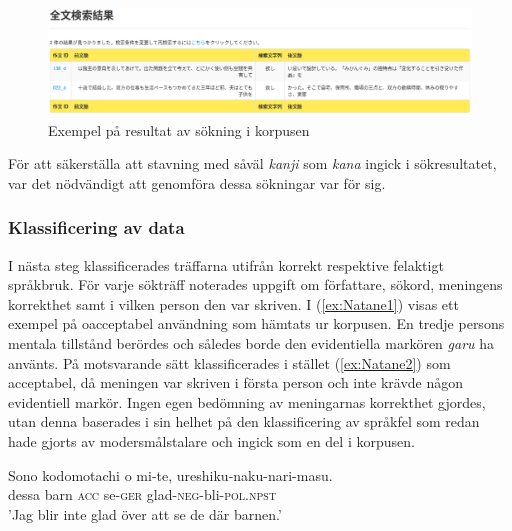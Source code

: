 \documentclass[12pt,a4paper]{article}
\begin{document}
\begin{figure}[h]
\caption{Exempel på resultat av sökning i korpusen}
\label{fig:Exempel på resultat av sökning}
\includegraphics[width=\textwidth]{images/Exempel på resultat av sökning}
\end{figure}

\noindent
För att säkerställa att stavning med såväl \emph{kanji} som \emph{kana} ingick i sökresultatet, var det nödvändigt att genomföra dessa sökningar var för sig.

\subsubsection{Klassificering av data}
\label{subsec:Undersökningen: Tillvägagångssätt: Klassificering av data}
I nästa steg klassificerades träffarna utifrån korrekt respektive felaktigt språkbruk. För varje sökträff noterades uppgift om författare, sökord, meningens korrekthet samt i vilken person den var skriven. I (\ref{ex:Natane1}) visas ett exempel på oacceptabel användning som hämtats ur korpusen. En tredje persons mentala tillstånd berördes och således borde den evidentiella markören \emph{garu} ha använts. På motsvarande sätt klassificerades i stället (\ref{ex:Natane2}) som acceptabel, då meningen var skriven i första person och inte krävde någon evidentiell markör. Ingen egen bedömning av meningarnas korrekthet gjordes, utan  denna baserades i sin helhet på den klassificering av språkfel som redan hade gjorts av modersmålstalare och ingick som en del i korpusen.

\begin{exe}
\end{exe}

\begin{exe}
\ex
\label{ex:Natane2}
\gll Sono kodomotachi o mi-te, ureshiku-naku-nari-masu. \\
     dessa barn \textsc{acc} se-\textsc{ger} glad-\textsc{neg}-bli-\textsc{pol}.\textsc{npst} \\
\glt 'Jag blir inte glad över att se de där barnen.'
\end{exe}
\end{document}

